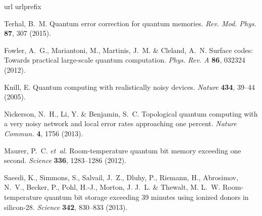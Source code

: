 \documentclass[aps,prb,superscriptaddress,nobibnotes,twocolumn]{revtex4-1}
\begin{document}
\begin{thebibliography}{10}

\expandafter\ifx\csname url\endcsname\relax
  \def\url#1{\texttt{#1}}\fi
\expandafter\ifx\csname urlprefix\endcsname\relax\def\urlprefix{URL }\fi
\providecommand{\bibinfo}[2]{#2}
\providecommand{\eprint}[2][]{\url{#2}}

\bibinfo{author}{Terhal, B.~M.}
\newblock \bibinfo{title}{Quantum error correction for quantum memories}.
\newblock \emph{\bibinfo{journal}{Rev. Mod. Phys.}}
  \textbf{\bibinfo{volume}{87}}, \bibinfo{pages}{307} (\bibinfo{year}{2015}).

\bibinfo{author}{Fowler, A.~G.}, \bibinfo{author}{Mariantoni, M.},
  \bibinfo{author}{Martinis, J.~M.} \& \bibinfo{author}{Cleland, A.~N.}
\newblock \bibinfo{title}{Surface codes: Towards practical large-scale quantum
  computation}.
\newblock \emph{\bibinfo{journal}{Phys. Rev. A}} \textbf{\bibinfo{volume}{86}},
  \bibinfo{pages}{032324} (\bibinfo{year}{2012}).

\bibinfo{author}{Knill, E.}
\newblock \bibinfo{title}{Quantum computing with realistically noisy devices}.
\newblock \emph{\bibinfo{journal}{Nature}} \textbf{\bibinfo{volume}{434}},
  \bibinfo{pages}{39--44} (\bibinfo{year}{2005}).

\bibinfo{author}{Nickerson, N.~H.}, \bibinfo{author}{Li, Y.} \&
  \bibinfo{author}{Benjamin, S.~C.}
\newblock \bibinfo{title}{Topological quantum computing with a very noisy
  network and local error rates approaching one percent}.
\newblock \emph{\bibinfo{journal}{Nature Commun.}} \textbf{\bibinfo{volume}{4}},
  \bibinfo{pages}{1756} (\bibinfo{year}{2013}).

\bibinfo{author}{Maurer, P.~C.} \emph{et~al.}
\newblock \bibinfo{title}{Room-temperature quantum bit memory exceeding one
  second}.
\newblock \emph{\bibinfo{journal}{Science}} \textbf{\bibinfo{volume}{336}},
  \bibinfo{pages}{1283--1286} (\bibinfo{year}{2012}).

\bibinfo{author}{Saeedi, K.}, \bibinfo{author}{Simmons, S.},
  \bibinfo{author}{Salvail, J.~Z.}, \bibinfo{author}{Dluhy, P.},
  \bibinfo{author}{Riemann, H.}, \bibinfo{author}{Abrosimov, N.~V.},
  \bibinfo{author}{Becker, P.}, \bibinfo{author}{Pohl, H.-J.},
  \bibinfo{author}{Morton, J. J.~L.} \& \bibinfo{author}{Thewalt, M. L.~W.}
\newblock \bibinfo{title}{Room-temperature quantum bit storage exceeding 39
  minutes using ionized donors in silicon-28}.
\newblock \emph{\bibinfo{journal}{Science}} \textbf{\bibinfo{volume}{342}},
  \bibinfo{pages}{830--833} (\bibinfo{year}{2013}).


\end{thebibliography}
\end{document}
